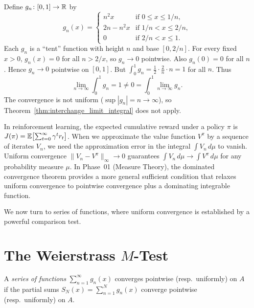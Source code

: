 \documentclass[11pt,a4paper]{article}
\begin{document}
\begin{example}
\label{ex:interchange_fails}
Define $g_n \colon [0, 1] \to \mathbb{R}$ by
\[
  g_n(x) = \begin{cases}
    n^2 x & \text{if } 0 \le x \le 1/n, \\
    2n - n^2 x & \text{if } 1/n < x \le 2/n, \\
    0 & \text{if } 2/n < x \le 1.
  \end{cases}
\]
Each $g_n$ is a ``tent'' function with height $n$ and base $[0, 2/n]$.
For every fixed $x > 0$, $g_n(x) = 0$ for all $n > 2/x$, so
$g_n \to 0$ pointwise. Also $g_n(0) = 0$ for all $n$. Hence
$g_n \to 0$ pointwise on $[0, 1]$. But
$\int_0^1 g_n = \frac{1}{2} \cdot \frac{2}{n} \cdot n = 1$ for all $n$.
Thus
\[
  \lim_{n \to \infty} \int_0^1 g_n = 1 \neq 0
  = \int_0^1 \lim_{n \to \infty} g_n.
\]
The convergence is not uniform ($\sup |g_n| = n \to \infty$), so
Theorem~\ref{thm:interchange_limit_integral} does not apply.
\end{example}

\begin{rlconnection}[title={Uniform convergence and expected reward computation}]
In reinforcement learning, the expected cumulative reward under a policy
$\pi$ is $J(\pi) = \mathbb{E}\bigl[\sum_{t=0}^\infty \gamma^t r_t\bigr]$. When
we approximate the value function $V^\pi$ by a sequence of iterates
$V_n$, we need the approximation error in the integral
$\int V_n\,d\mu$ to vanish. Uniform convergence
$\|V_n - V^\pi\|_\infty \to 0$ guarantees
$\int V_n\,d\mu \to \int V^\pi\,d\mu$ for any probability measure
$\mu$. In Phase~01 (Measure Theory), the dominated convergence theorem
provides a more general sufficient condition that relaxes uniform
convergence to pointwise convergence plus a dominating integrable
function.
\end{rlconnection}

We now turn to series of functions, where uniform convergence is
established by a powerful comparison test.

\section{The Weierstrass $M$-Test}
\label{sec:weierstrass}

A \emph{series of functions} $\sum_{n=1}^\infty g_n(x)$ converges
pointwise (resp.\ uniformly) on $A$ if the partial sums
$S_N(x) = \sum_{n=1}^N g_n(x)$ converge pointwise (resp.\ uniformly)
on $A$.
\end{document}
